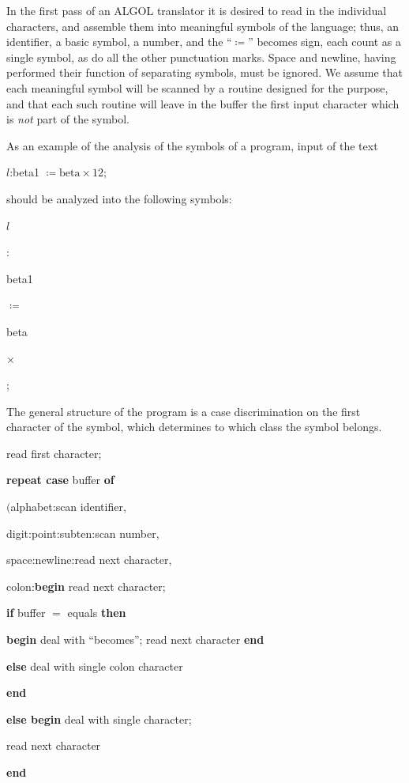 \documentclass[twoside,11pt]{book}
\begin{document}
In the first pass of an ALGOL translator it is desired to read in the individual characters, and assemble them into meaningful symbols of the language; thus, an identifier, a basic symbol, a number, and the ``$\coloneq$'' becomes sign, each count as a single symbol, as do all the other punctuation marks. Space and newline, having performed their function of separating symbols, must be ignored. We assume that each meaningful symbol will be scanned by a routine designed for the purpose, and that each such routine will leave in the buffer the first input character which is \textit{not} part of the symbol.

As an example of the analysis of the symbols of a program, input of the text

\quad $l$:beta1 $\coloneq \text{beta} \times 12$;

\noindent
should be analyzed into the following symbols:

\quad $l$

\quad :

\quad beta1

\quad $\coloneq$

\quad beta

\quad $\times$


\quad ;

The general structure of the program is a case discrimination on the first character of the symbol, which determines to which class the symbol belongs.

read first character;

\textbf{repeat case} buffer \textbf{of}

\quad $($alphabet:scan identifier,

\quad digit:point:subten:scan number,

\quad space:newline:read next character,

\quad colon:\textbf{begin} read next character;

\quad\quad \textbf{if} buffer $=$ equals \textbf{then}

\quad\quad\quad \textbf{begin} deal with ``becomes''; read next character \textbf{end}

\quad\quad \textbf{else} deal with single colon character

\quad\quad \textbf{end}

\quad \textbf{else begin} deal with single character;

\quad\quad read next character

\quad \textbf{end}
\end{document}
